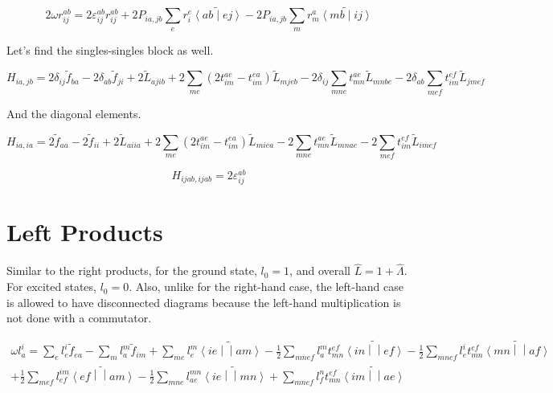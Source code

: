 \documentclass{article}
\newcommand{\tei}[2]{\left<{#1}\middle|\middle|{#2}\right>}
\begin{document}
\begin{equation}
  2\omega r_{ij}^{ab} = 2\varepsilon_{ij}^{ab}r_{ij}^{ab} + 2P_{ia,jb}\sum_er_i^e\widetilde{\left<ab\middle|ej\right>} - 2P_{ia,jb}\sum_mr_m^a\widetilde{\left<mb\middle|ij\right>}
\end{equation}

Let's find the singles-singles block as well.

\begin{equation}
  H_{ia,jb} = 2\delta_{ij}\tilde{f}_{ba} - 2\delta_{ab}\tilde{f}_{ji} + 2\tilde{L}_{ajib} + 2\sum_{me}\left(2t_{im}^{ae} - t_{im}^{ea}\right)\tilde{L}_{mjeb} - 2\delta_{ij}\sum_{mne}t_{mn}^{ae}\tilde{L}_{mnbe} - 2\delta_{ab}\sum_{mef}t_{im}^{ef}\tilde{L}_{jmef}
\end{equation}

And the diagonal elements.

\begin{equation}
  H_{ia,ia} = 2\tilde{f}_{aa} - 2\tilde{f}_{ii} + 2\tilde{L}_{aiia} + 2\sum_{me}\left(2t_{im}^{ae} - t_{im}^{ea}\right)\tilde{L}_{miea} - 2\sum_{mne}t_{mn}^{ae}\tilde{L}_{mnae} - 2\sum_{mef}t_{im}^{ef}\tilde{L}_{imef}
\end{equation}

\begin{equation}
  H_{ijab,ijab} = 2\varepsilon_{ij}^{ab}
\end{equation}

\section{Left Products}

Similar to the right products, for the ground state, $l_0 = 1$, and overall $\hat{L} = 1 + \hat{\Lambda}$. For excited states, $l_0 = 0$. Also, unlike for the right-hand case, the left-hand case is allowed to have disconnected diagrams because the left-hand multiplication is not done with a commutator.

\begin{multline}
  \omega l_a^i = \sum_el_e^i\tilde{f}_{ea} - \sum_ml_a^m\tilde{f}_{im} + \sum_{me}l_e^m\widetilde{\tei{ie}{am}} - \frac{1}{2}\sum_{mnef}l_a^mt_{mn}^{ef}\widetilde{\tei{in}{ef}} - \frac{1}{2}\sum_{mnef}l_e^it_{mn}^{ef}\widetilde{\tei{mn}{af}}\\
  + \frac{1}{2}\sum_{mef}l_{ef}^{im}\widetilde{\tei{ef}{am}} - \frac{1}{2}\sum_{mne}l_{ae}^{mn}\widetilde{\tei{ie}{mn}} + \sum_{mnef}l_f^nt_{mn}^{ef}\widetilde{\tei{im}{ae}}
\end{multline}
\end{document}
